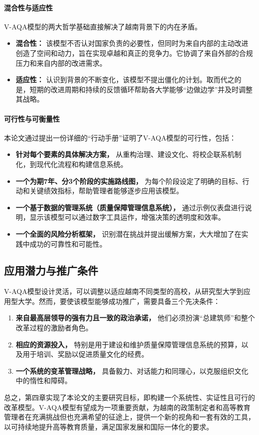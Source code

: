 \paragraph{混合性与适应性}
V-AQA模型的两大哲学基础直接解决了越南背景下的内在矛盾。
\begin{itemize}
    \item \textbf{混合性：} 该模型不否认对国家负责的必要性，但同时为来自内部的主动改进创造了空间和动力，旨在实现卓越和真正的竞争力。它协调了来自外部的合规压力和来自内部的改进需求。
    \item \textbf{适应性：} 认识到背景的不断变化，该模型不提出僵化的计划。取而代之的是，短期的改进周期和持续的反馈循环帮助各大学能够“边做边学”并及时调整其战略。
\end{itemize}

\paragraph{可行性与可衡量性}
本论文通过提出一份详细的“行动手册”证明了V-AQA模型的可行性，包括：
\begin{itemize}
    \item \textbf{针对每个要素的具体解决方案，} 从重构治理、建设文化、将校企联系机制化，到现代化流程和构建信息系统。
    \item \textbf{一个为期7年、分3个阶段的实施路线图，} 为每个阶段设定了明确的目标、行动和关键绩效指标，帮助管理者能够逐步应用该模型。
    \item \textbf{一个基于数据的管理系统（质量保障管理信息系统），} 通过示例仪表盘进行说明，显示该模型可以通过数字工具运作，增强决策的透明度和效率。
    \item \textbf{一个全面的风险分析框架，} 识别潜在挑战并提出缓解方案，大大增加了在实践中成功的可靠性和可能性。
\end{itemize}

\subsection*{应用潜力与推广条件}
V-AQA模型设计灵活，可以调整以适应越南不同类型的高校，从研究型大学到应用型大学。然而，要使该模型能够成功推广，需要具备三个先决条件：
\begin{enumerate}
    \item \textbf{来自最高层领导的强有力且一致的政治承诺，} 他们必须扮演“总建筑师”和整个改革过程的激励者角色。
    \item \textbf{相应的资源投入，} 特别是用于建设和维护质量保障管理信息系统的预算，以及用于培训、奖励以促进质量文化的经费。
    \item \textbf{一个系统的变革管理战略，} 具备毅力、对话能力和同理心，以克服组织文化中的惰性和障碍。
\end{enumerate}

总之，第四章实现了本论文的主要研究目标，即构建一个系统性、实证性且可行的改革模型。V-AQA模型有望成为一项重要贡献，为越南的政策制定者和高等教育管理者在充满挑战但也充满希望的征途上，提供一个新的视角和一套有效的工具，以可持续地提升高等教育质量，满足国家发展和国际一体化的要求。





















